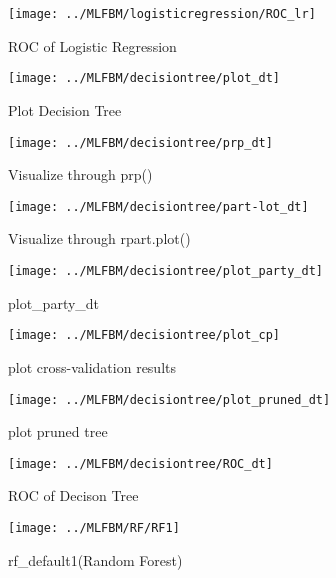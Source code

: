 \documentclass[12pt, a4paper, bibliography=totoc, english]{scrartcl}
\begin{document}


\begin{figure}
	\centering
	\texttt{[image: ../MLFBM/logisticregression/ROC\_lr]}
	\caption{ROC of Logistic Regression}
	\label{fig:roclr}
\end{figure}


\begin{figure}
	\centering
	\texttt{[image: ../MLFBM/decisiontree/plot\_dt]}
	\caption{Plot Decision Tree}
	\label{fig:plotdt}
\end{figure}

\begin{figure}
	\centering
	\texttt{[image: ../MLFBM/decisiontree/prp\_dt]}
	\caption{Visualize through prp()}
	\label{fig:prpdt}
\end{figure}

\begin{figure}
	\centering
	\texttt{[image: ../MLFBM/decisiontree/part-lot\_dt]}
	\caption{Visualize through rpart.plot()}
	\label{fig:part-lotdt}
\end{figure}

\begin{figure}
	\centering
	\texttt{[image: ../MLFBM/decisiontree/plot\_party\_dt]}
	\caption{plot\_party\_dt}
	\label{fig:plotpartydt}
\end{figure}

\begin{figure}
	\centering
	\texttt{[image: ../MLFBM/decisiontree/plot\_cp]}
	\caption{plot cross-validation results}
	\label{fig:plotcp}
\end{figure}
\begin{figure}
	\centering
	\texttt{[image: ../MLFBM/decisiontree/plot\_pruned\_dt]}
	\caption{plot pruned tree}
	\label{fig:plotpruneddt}
\end{figure}

\begin{figure}
	\centering
	\texttt{[image: ../MLFBM/decisiontree/ROC\_dt]}
	\caption{ROC of Decison Tree}
	\label{fig:rocdt}
\end{figure}


\begin{figure}
	\centering
	\texttt{[image: ../MLFBM/RF/RF1]}
	\caption{rf\_default1(Random Forest)}
	\label{fig:rf1}
\end{figure}
\end{document}
